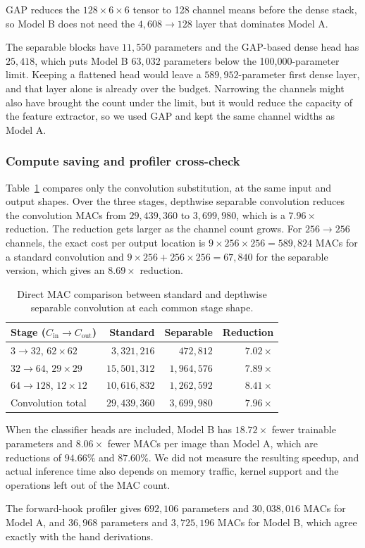 GAP reduces the $128\times6\times6$ tensor to 128 channel means before the
dense stack, so Model B does not need the $4{,}608\rightarrow128$ layer that
dominates Model A.

The separable blocks have $11{,}550$ parameters and the GAP-based dense head
has $25{,}418$, which puts Model B $63{,}032$ parameters below the
100,000-parameter limit.  Keeping a flattened head would leave a
$589{,}952$-parameter first dense layer, and that layer alone is already over
the budget.  Narrowing the channels might also have brought the count under
the limit, but it would reduce the capacity of the feature extractor, so we
used GAP and kept the same channel widths as Model A.

\subsubsection{Compute saving and profiler cross-check}

Table~\ref{tab:separable-mac-saving} compares only the convolution
substitution, at the same input and output shapes.  Over the three stages,
depthwise separable convolution reduces the convolution MACs from
$29{,}439{,}360$ to $3{,}699{,}980$, which is a $7.96\times$ reduction.  The
reduction gets larger as the channel count grows.  For $256\rightarrow256$
channels, the exact cost per output location is
$9\times256\times256=589{,}824$ MACs for a standard convolution and
$9\times256+256\times256=67{,}840$ for the separable version, which gives an
$8.69\times$ reduction.

\begin{table}[htbp]
  \centering
  \caption{Direct MAC comparison between standard and depthwise separable
  convolution at each common stage shape.}
  \label{tab:separable-mac-saving}
  \begin{tabular}{lrrr}
    \hline
    Stage ($C_{\mathrm{in}}\rightarrow C_{\mathrm{out}}$) & Standard & Separable & Reduction \\
    \hline
    $3\rightarrow32$, $62\times62$ & $3{,}321{,}216$ & $472{,}812$ & $7.02\times$ \\
    $32\rightarrow64$, $29\times29$ & $15{,}501{,}312$ & $1{,}964{,}576$ & $7.89\times$ \\
    $64\rightarrow128$, $12\times12$ & $10{,}616{,}832$ & $1{,}262{,}592$ & $8.41\times$ \\
    \hline
    Convolution total & $29{,}439{,}360$ & $3{,}699{,}980$ & $7.96\times$ \\
    \hline
  \end{tabular}
\end{table}

When the classifier heads are included, Model B has $18.72\times$ fewer
trainable parameters and $8.06\times$ fewer MACs per image than Model A,
which are reductions of $94.66\%$ and $87.60\%$.  We did not measure the
resulting speedup, and actual inference time also depends on memory traffic,
kernel support and the operations left out of the MAC count.

The forward-hook profiler gives $692{,}106$ parameters and $30{,}038{,}016$
MACs for Model A, and $36{,}968$ parameters and $3{,}725{,}196$ MACs for
Model B, which agree exactly with the hand derivations.
